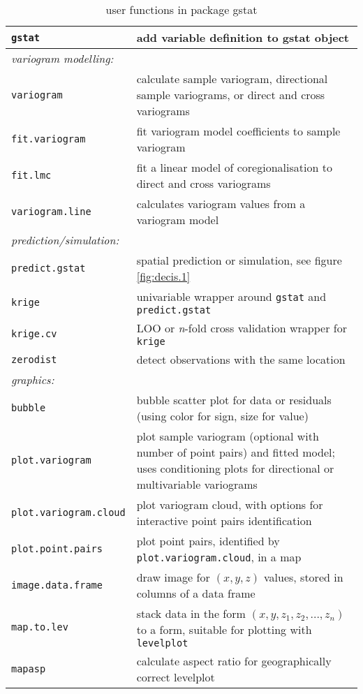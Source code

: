 \documentclass[a4paper,12pt]{book}
\begin{document}
\begin{table}
\begin{tabular}{p{4cm}p{8cm}} \hline
{\tt gstat} & add variable definition to gstat object \\ \hline
{\em variogram modelling:} & \\
{\tt variogram} & calculate sample variogram, directional sample variograms, or
direct
and cross variograms \\
{\tt fit.variogram} & fit variogram model coefficients to sample variogram \\
{\tt fit.lmc} & fit a linear model of coregionalisation to direct and cross variograms \\
{\tt variogram.line} & calculates variogram values from a variogram model \\ \hline
{\em prediction/simulation:} & \\
{\tt predict.gstat} & spatial prediction or simulation, see figure \ref{fig:decis.1}  \\
{\tt krige} & univariable wrapper around {\tt gstat} and {\tt predict.gstat} \\
{\tt krige.cv} & LOO or {\em n}-fold cross validation wrapper for {\tt krige} \\{\tt zerodist} & detect observations with the same location \\ \hline
{\em graphics:} & \\
{\tt bubble} & bubble scatter plot for data or residuals (using color for sign,
size for value) \\
{\tt plot.variogram} & plot sample variogram (optional with number of point
pairs) and fitted model; uses conditioning plots for directional or
multivariable variograms \\
{\tt plot.variogram.cloud} & plot variogram cloud, with options for interactive
point pairs identification \\
{\tt plot.point.pairs} & plot point pairs, identified by {\tt plot.variogram.cloud}, in a map \\
{\tt image.data.frame} & draw image for $(x,y,z)$ values, stored in columns of a data frame\\
{\tt map.to.lev} & stack data in the form $(x,y,z_1,z_2,...,z_n)$ to a form,
suitable for plotting with {\tt levelplot} \\
{\tt mapasp} & calculate aspect ratio for geographically correct levelplot \\
\hline
\end{tabular}
\caption{user functions in package gstat}
\label{tab:functions}
\end{table}
\end{document}
